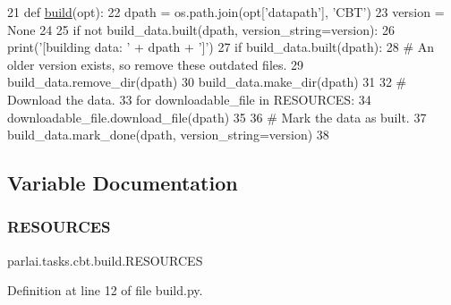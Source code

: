 \begin{DoxyCode}
21 \textcolor{keyword}{def }\hyperlink{namespacedialog__babi__feedback_1_1build_a7a9d289f7493a5ded13c4b7f071b6184}{build}(opt):
22     dpath = os.path.join(opt[\textcolor{stringliteral}{'datapath'}], \textcolor{stringliteral}{'CBT'})
23     version = \textcolor{keywordtype}{None}
24 
25     \textcolor{keywordflow}{if} \textcolor{keywordflow}{not} build\_data.built(dpath, version\_string=version):
26         print(\textcolor{stringliteral}{'[building data: '} + dpath + \textcolor{stringliteral}{']'})
27         \textcolor{keywordflow}{if} build\_data.built(dpath):
28             \textcolor{comment}{# An older version exists, so remove these outdated files.}
29             build\_data.remove\_dir(dpath)
30         build\_data.make\_dir(dpath)
31 
32         \textcolor{comment}{# Download the data.}
33         \textcolor{keywordflow}{for} downloadable\_file \textcolor{keywordflow}{in} RESOURCES:
34             downloadable\_file.download\_file(dpath)
35 
36         \textcolor{comment}{# Mark the data as built.}
37         build\_data.mark\_done(dpath, version\_string=version)
38 \end{DoxyCode}


\subsection{Variable Documentation}
\mbox{\label{namespaceparlai_1_1tasks_1_1cbt_1_1build_ae61376a94258f62bf821655af3f1f3cf}} 
\subsubsection{\texorpdfstring{R\+E\+S\+O\+U\+R\+C\+ES}{RESOURCES}}
{\footnotesize\ttfamily parlai.\+tasks.\+cbt.\+build.\+R\+E\+S\+O\+U\+R\+C\+ES}



Definition at line 12 of file build.\+py.

